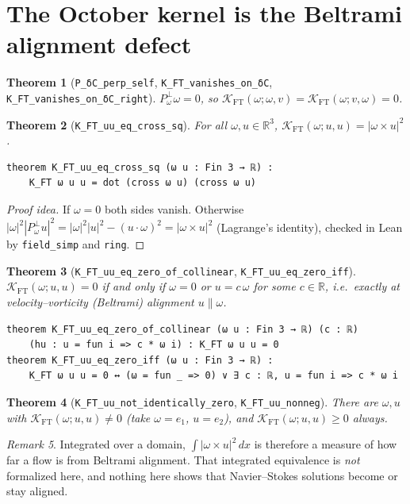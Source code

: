 \documentclass[11pt]{article}
\newtheorem{theorem}{Theorem}
\theoremstyle{definition}
\theoremstyle{remark}
\newtheorem{remark}[theorem]{Remark}
\newcommand{\lean}[1]{\texttt{\upshape #1}}
\newcommand{\R}{\mathbb{R}}
\newcommand{\KFT}{\mathcal{K}_{\mathrm{FT}}}
\begin{document}
\section{The October kernel is the Beltrami alignment defect}
\begin{theorem}[\lean{P_δC_perp_self}, \lean{K_FT_vanishes_on_δC}, \lean{K_FT_vanishes_on_δC_right}]
$P_\omega^\perp\omega=0$, so $\KFT(\omega;\omega,v)=\KFT(\omega;v,\omega)=0$.
\end{theorem}
\begin{theorem}[\lean{K_FT_uu_eq_cross_sq}]
For all $\omega,u\in\R^3$, $\KFT(\omega;u,u)=|\omega\times u|^2$.
\begin{Verbatim}[fontsize=\small]
theorem K_FT_uu_eq_cross_sq (ω u : Fin 3 → ℝ) :
    K_FT ω u u = dot (cross ω u) (cross ω u)
\end{Verbatim}
\end{theorem}
\begin{proof}[Proof idea]
If $\omega=0$ both sides vanish. Otherwise
$|\omega|^2|P_\omega^\perp u|^2=|\omega|^2|u|^2-(u\cdot\omega)^2=|\omega\times u|^2$
(Lagrange's identity), checked in Lean by \lean{field_simp} and \lean{ring}.
\end{proof}
\begin{theorem}[\lean{K_FT_uu_eq_zero_of_collinear}, \lean{K_FT_uu_eq_zero_iff}]
$\KFT(\omega;u,u)=0$ if and only if $\omega=0$ or $u=c\,\omega$ for some
$c\in\R$, i.e.\ exactly at velocity--vorticity (Beltrami) alignment
$u\parallel\omega$.
\begin{Verbatim}[fontsize=\small]
theorem K_FT_uu_eq_zero_of_collinear (ω u : Fin 3 → ℝ) (c : ℝ)
    (hu : u = fun i => c * ω i) : K_FT ω u u = 0
theorem K_FT_uu_eq_zero_iff (ω u : Fin 3 → ℝ) :
    K_FT ω u u = 0 ↔ (ω = fun _ => 0) ∨ ∃ c : ℝ, u = fun i => c * ω i
\end{Verbatim}
\end{theorem}
\begin{theorem}[\lean{K_FT_uu_not_identically_zero}, \lean{K_FT_uu_nonneg}]
There are $\omega,u$ with $\KFT(\omega;u,u)\neq0$ (take $\omega=e_1$, $u=e_2$),
and $\KFT(\omega;u,u)\ge0$ always.
\end{theorem}
\begin{remark}
Integrated over a domain, $\int|\omega\times u|^2\,dx$ is therefore a measure of
how far a flow is from Beltrami alignment. That integrated equivalence is
\emph{not} formalized here, and nothing here shows that Navier--Stokes
solutions become or stay aligned.
\end{remark}
\end{document}
